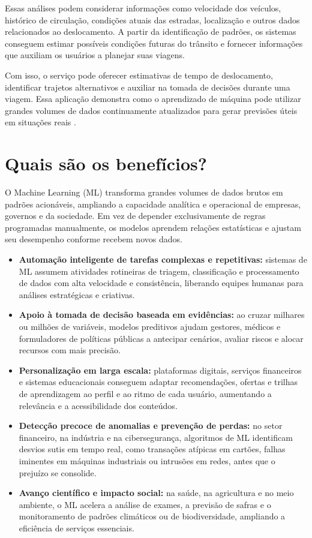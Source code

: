 Essas análises podem considerar informações como velocidade dos veículos, histórico de circulação, condições atuais das estradas, localização e outros dados relacionados ao deslocamento. A partir da identificação de padrões, os sistemas conseguem estimar possíveis condições futuras do trânsito e fornecer informações que auxiliam os usuários a planejar suas viagens.

Com isso, o serviço pode oferecer estimativas de tempo de deslocamento, identificar trajetos alternativos e auxiliar na tomada de decisões durante uma viagem. Essa aplicação demonstra como o aprendizado de máquina pode utilizar grandes volumes de dados continuamente atualizados para gerar previsões úteis em situações reais \cite{googleAIMaps}.


\chapter{Quais são os benefícios?}
O Machine Learning (ML) transforma grandes volumes de dados brutos em padrões acionáveis, ampliando a capacidade analítica e operacional de empresas, governos e da sociedade. Em vez de depender exclusivamente de regras programadas manualmente, os modelos aprendem relações estatísticas e ajustam seu desempenho conforme recebem novos dados.

\begin{itemize}
	\item \textbf{Automação inteligente de tarefas complexas e repetitivas:} sistemas de ML assumem atividades rotineiras de triagem, classificação e processamento de dados com alta velocidade e consistência, liberando equipes humanas para análises estratégicas e criativas.
	
	\item \textbf{Apoio à tomada de decisão baseada em evidências:} ao cruzar milhares ou milhões de variáveis, modelos preditivos ajudam gestores, médicos e formuladores de políticas públicas a antecipar cenários, avaliar riscos e alocar recursos com mais precisão.
	
	\item \textbf{Personalização em larga escala:} plataformas digitais, serviços financeiros e sistemas educacionais conseguem adaptar recomendações, ofertas e trilhas de aprendizagem ao perfil e ao ritmo de cada usuário, aumentando a relevância e a acessibilidade dos conteúdos.
	
	\item \textbf{Detecção precoce de anomalias e prevenção de perdas:} no setor financeiro, na indústria e na cibersegurança, algoritmos de ML identificam desvios sutis em tempo real, como transações atípicas em cartões, falhas iminentes em máquinas industriais ou intrusões em redes, antes que o prejuízo se consolide.
	
	\item \textbf{Avanço científico e impacto social:} na saúde, na agricultura e no meio ambiente, o ML acelera a análise de exames, a previsão de safras e o monitoramento de padrões climáticos ou de biodiversidade, ampliando a eficiência de serviços essenciais.
\end{itemize}


